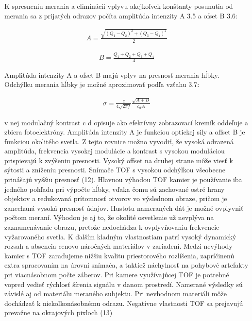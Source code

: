 K spresneniu merania a eliminácii vplyvu akejkoľvek konštanty posunutia od merania sa z
prijatých odrazov počíta amplitúda intenzity A 3.5 a ofset B 3.6:

\begin{equation}
\label{eq5}
\begin{aligned}
A=\frac{\sqrt{\left(Q_1 - Q_2\right)^2 + \left(Q_3 - Q_4\right)^2 }} {2} 
\end{aligned}
\end{equation}

\begin{equation}
\label{eq6}
\begin{aligned}
B=\frac{Q_1 + Q_2 +Q_3 + Q_4}{4} 
\end{aligned}
\end{equation}

Amplitúda intenzity A a ofset B majú vplyv na presnosť merania hĺbky. Odchýlku merania hĺbky je možné aproximovať podľa vzťahu 3.7:

\begin{equation}
\label{eq7}
\begin{aligned}
\sigma=\frac{c}{4\sqrt{2 \pi f}} \frac{\sqrt{A+B}}{c_d A}
\end{aligned}
\end{equation}

v nej modulačný kontrast c d opisuje ako efektívny zobrazovací kremík oddeľuje a zbiera fotoelektróny. Amplitúda intenzity A je funkciou optickej sily a offset B je funkciou okolitého svetla. Z tejto rovnice možno vyvodiť, že vysoká odrazená amplitúda, frekvencia vysokej modulácie a kontrast s vysokou moduláciou prispievajú k zvýšeniu presnosti. Vysoký offset na druhej strane môže viesť k sýtosti a zníženiu presnosti. Snímače TOF s vysokou odchýlkou všeobecne prinášajú vyššiu presnosť (12). Hlavnou výhodou TOF kamier je používanie iba jedného pohľadu pri výpočte hĺbky, vďaka čomu sú zachované ostré hrany objektov a redukovaná prítomnosť otvorov vo výslednom obraze, pričom je zanechaná vysoká presnosť údajov. Hustotu nameraných dát je možné ovplyvniť počtom meraní. Výhodou je aj to, že okolité osvetlenie už nevplýva na zaznamenávanie obrazu, pretože nedochádza k ovplyvňovaniu frekvencie vyžarovaného svetla. K ďalším kladným vlastnostiam patrí vysoký dynamický rozsah a absencia cenovo náročných materiálov v zariadení. Medzi nevýhody kamier s TOF zaraďujeme nižšiu kvalitu priestorového rozlíšenia, zapríčinenú extra spracovaním na úrovni snímača, a taktiež náchylnosť na pohybové artefakty pri viacnásobnom počte záberov. Pri kamere využívajúcej TOF je potrebné vopred vedieť rýchlosť šírenia signálu v danom prostredí. Namerané výsledky sú závislé aj od materiálu meraného subjektu. Pri nevhodnom materiáli môže dochádzať k niekoľkonásobnému odrazu. Negatívne vlastnosti TOF sa prejavujú prevažne na okrajových pixloch (13)

